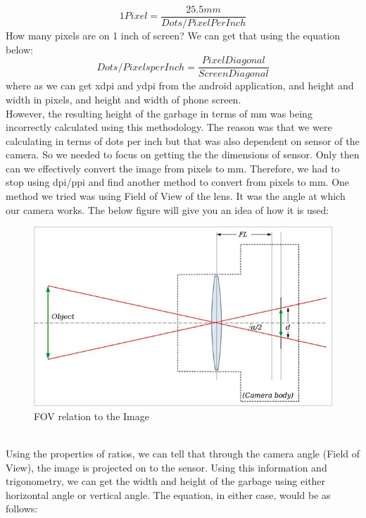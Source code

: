 \begin{equation}
    1 Pixel = \frac{25.5 mm}{Dots/Pixel Per Inch}
\end{equation}
How many pixels are on 1 inch of screen? We can get that using the equation below:
\begin{equation}
    Dots/Pixels per Inch = \frac{Pixel Diagonal}{Screen Diagonal}
\end{equation}
where as we can get xdpi and ydpi from the android application, and height and width in pixels, and height and width of phone screen.\\
However, the resulting height of the garbage in terms of mm was being incorrectly calculated using this methodology. The reason was that we were calculating in terms of dots per inch but that was also dependent on sensor of the camera. So we needed to focus on getting the the dimensions of sensor. Only then can we effectively convert the image from pixels to mm. Therefore, we had to stop using dpi/ppi and find another method to convert from pixels to mm. One method we tried was using Field of View of the lens. It was the angle at which our camera works. The below figure will give you an idea of how it is used:\\
\begin{figure}
    \centering
    \includegraphics[scale=0.5]{images/fov.jpeg}
    \caption{FOV relation to the Image}
    \label{fig:fov}
\end{figure}
\\
Using the properties of ratios, we can tell that through the camera angle (Field of View), the image is projected on to the sensor. Using this information and trigonometry, we can get the width and height of the garbage using either horizontal angle or vertical angle. The equation, in either case, would be as follows:
